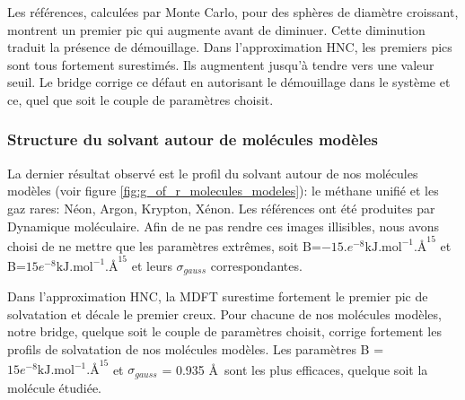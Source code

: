 Les références, calculées par Monte Carlo, pour des sphères de diamètre croissant, montrent un premier pic qui augmente avant de diminuer. Cette diminution traduit la présence de démouillage. Dans l'approximation HNC, les premiers pics sont tous fortement surestimés. Ils augmentent jusqu'à tendre vers une valeur seuil. Le bridge corrige ce défaut en autorisant le démouillage dans le système et ce, quel que soit le couple de paramètres choisit. 




\subsubsection{ Structure du solvant autour de molécules modèles}
La dernier résultat observé est le profil du solvant autour de nos molécules modèles (voir figure \ref{fig:g_of_r_molecules_modeles}): le méthane unifié et les gaz rares: Néon, Argon, Krypton, Xénon. Les références ont été produites par Dynamique moléculaire. Afin de ne pas rendre ces images illisibles, nous avons choisi de ne mettre que les paramètres extrêmes, soit B=$-15.e^{-8} \mathrm{kJ.mol}^{-1}.\text{\AA}^{15}$ et B=$15e^{-8} \mathrm{kJ.mol}^{-1}.\text{\AA}^{15}$ et leurs $\sigma_{gauss}$ correspondantes.


Dans l'approximation HNC, la MDFT surestime fortement le premier pic de solvatation et décale le premier creux. Pour chacune de nos molécules modèles, notre bridge, quelque soit le couple de paramètres choisit, corrige fortement les profils de solvatation de nos molécules modèles. Les paramètres B = $15e^{-8} \mathrm{kJ.mol}^{-1}.\text{\AA}^{15}$ et $\sigma_{gauss}$ = 0.935 \AA\ sont les plus efficaces, quelque soit la molécule étudiée.




